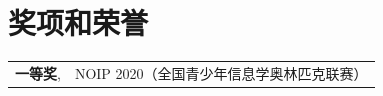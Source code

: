 
\section{奖项和荣誉}
\begin{tabularx}{\linewidth}{@{}l X@{}}
\textbf{一等奖}, & NOIP 2020（全国青少年信息学奥林匹克联赛） \\
\end{tabularx}
